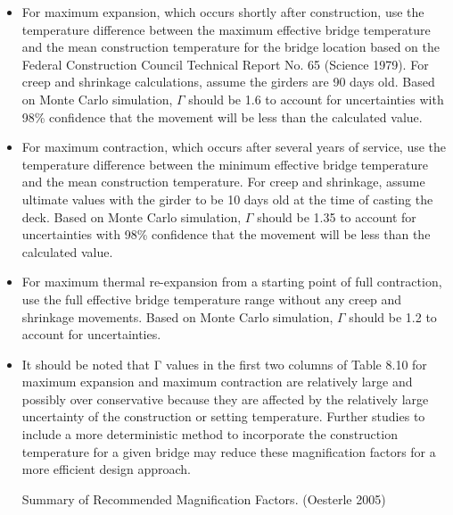 \begin{itemize}
  \item For maximum expansion, which occurs shortly after construction, use the temperature difference between the maximum effective bridge temperature and the mean construction temperature for the bridge location based on the Federal Construction Council Technical Report No. 65 (Science 1979). For creep and shrinkage calculations, assume the girders are 90 days old. Based on Monte Carlo simulation, $\Gamma$ should be 1.6 to account for uncertainties with 98\% confidence that the movement will be less than the calculated value.
  \item For maximum contraction, which occurs after several years of service, use the temperature difference between the minimum effective bridge temperature and the mean construction temperature. For creep and shrinkage, assume ultimate values with the girder to be 10 days old at the time of casting the deck. Based on Monte Carlo simulation, $\Gamma$ should be 1.35 to account for uncertainties with 98\% confidence that the movement will be less than the calculated value.
  \item For maximum thermal re-expansion from a starting point of full contraction, use the full effective bridge temperature range without any creep and shrinkage movements. Based on Monte Carlo simulation, $\Gamma$ should be 1.2 to account for uncertainties.
  \item It should be noted that Γ values in the first two columns of Table 8.10 for maximum expansion and maximum contraction are relatively large and possibly over conservative because they are affected by the relatively large uncertainty of the construction or setting temperature. Further studies to include a more deterministic method to incorporate the construction temperature for a given bridge may reduce these magnification factors for a more efficient design approach.
  \begin{table}
    \caption{Summary of Recommended Magnification Factors. (Oesterle 2005)}
    \label{tab:recommended-magnification-factors}
  \end{table}
\end{itemize}


